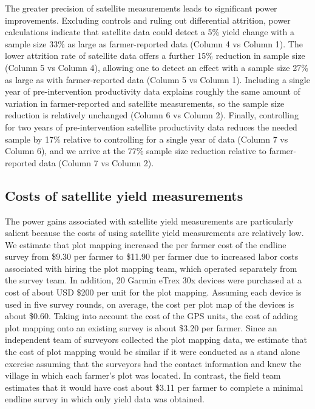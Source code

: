 \documentclass{article}
\begin{document}
The greater precision of satellite measurements leads to significant power improvements. Excluding controls and ruling out differential attrition, power calculations indicate that satellite data could detect a 5\% yield change with a sample size 33\% as large as farmer-reported data (Column 4 vs Column 1). The lower attrition rate of satellite data offers a further 15\% reduction in sample size (Column 5 vs Column 4), allowing one to detect an effect with a sample size 27\% as large as with farmer-reported data (Column 5 vs Column 1). Including a single year of pre-intervention productivity data explains roughly the same amount of variation in farmer-reported and satellite measurements, so the sample size reduction is relatively unchanged (Column 6 vs Column 2). Finally, controlling for two years of pre-intervention satellite productivity data reduces the needed sample by 17\% relative to controlling for a single year of data (Column 7 vs Column 6), and we arrive at the 77\% sample size reduction relative to farmer-reported data (Column 7 vs Column 2). 

\subsection{Costs of satellite yield measurements}

The power gains associated with satellite yield measurements are particularly salient because the costs of using satellite yield measurements are relatively low. We estimate that plot mapping increased the per farmer cost of the endline survey from \$9.30 per farmer to \$11.90 per farmer due to increased labor costs associated with hiring the plot mapping team, which operated separately from the survey team. In addition, 20 Garmin eTrex 30x devices were purchased at a cost of about USD \$200 per unit for the plot mapping. Assuming each device is used in five survey rounds, on average, the cost per plot map of the devices is about \$0.60. Taking into account the cost of the GPS units, the cost of adding plot mapping onto an existing survey is about \$3.20 per farmer. Since an independent team of surveyors collected the plot mapping data, we estimate that the cost of plot mapping would be similar if it were conducted as a stand alone exercise assuming that the surveyors had the contact information and knew the village in which each farmer’s plot was located. In contrast, the field team estimates that it would have cost about \$3.11 per farmer to complete a minimal endline survey in which only yield data was obtained. 
\end{document}
